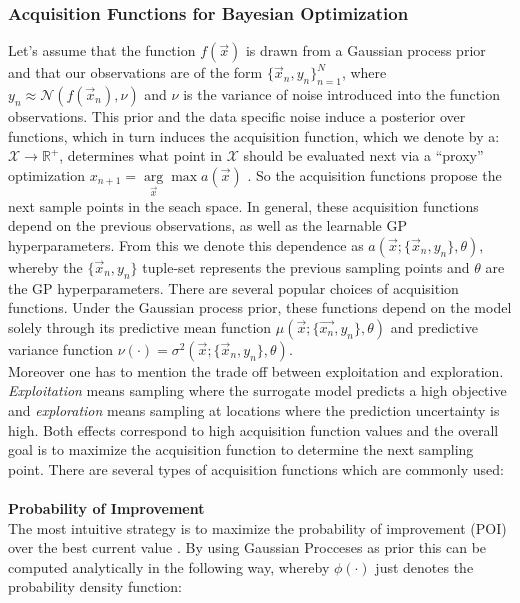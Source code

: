 \documentclass[12pt, a4paper]{article}
\begin{document}
\subsubsection{Acquisition Functions for Bayesian Optimization}
Let's assume that the function $f(\vec{x})$ is drawn from a Gaussian process prior and that our observations are of the form $\{\vec{x}_n,y_n\}_{n=1}^N$, where $y_n \approx \mathcal{N}(f(\vec{x}_n),\nu)$ and $\nu$ is the variance of noise introduced into the function observations.
This prior and the data specific noise induce a posterior over functions, which in turn induces the acquisition function, which we denote by a: $\mathcal{X} \rightarrow \mathbb{R}^{+}$, determines what point in $\mathcal{X}$ should be evaluated next via a ``proxy'' optimization $x_{n+1} = \underset{\vec{x}}\arg\max a(\vec{x})$ \cite{Snoek2012}. So the acquisition functions propose the next sample points in the seach space. In general, these acquisition functions depend on the previous observations, as well as the learnable GP hyperparameters. From this we denote this dependence as $a(\vec{x};\{\vec{x}_n,y_n\},\theta)$, whereby the $\{\vec{x}_n,y_n\}$ tuple-set represents the previous sampling points and $\theta$ are the GP hyperparameters.
There are several popular choices of acquisition functions. Under the Gaussian process prior, these functions depend on the model solely through its predictive mean function $\mu(\vec{x};\{\vec{x_n},y_n\},\theta)$ and predictive variance function $\nu(\cdot) = \sigma^2(\vec{x};\{\vec{x}_n, y_n\}, \theta)$.\\
Moreover one has to mention the trade off between exploitation and exploration.\\
\textit{Exploitation} means sampling where the surrogate model predicts a high objective and \textit{exploration} means sampling at locations where the prediction uncertainty is high. Both effects correspond to high acquisition function values and the overall goal is to maximize the acquisition function to determine the next sampling point. There are several types of acquisition functions which are commonly used: \\
\\
\textbf{Probability of Improvement} \\
The most intuitive strategy is to maximize the probability of improvement (POI) over the best current value \cite{Kushner1964}. By using Gaussian Procceses as prior this can be computed analytically in the following way, whereby $\phi(\cdot)$ just denotes the probability density function:
\end{document}
